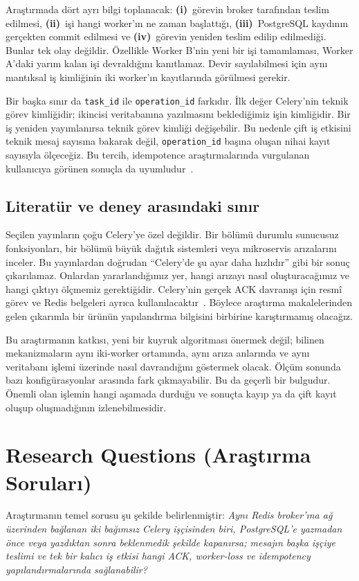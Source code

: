 \documentclass[conference,a4paper]{IEEEtran}
\newcommand{\code}[1]{\texttt{#1}}
\begin{document}
Araştırmada dört ayrı bilgi toplanacak: \textbf{(i)}\ görevin broker tarafından teslim edilmesi, \textbf{(ii)}\ işi hangi worker'ın ne zaman başlattığı, \textbf{(iii)}\ PostgreSQL kaydının gerçekten commit edilmesi ve \textbf{(iv)}\ görevin yeniden teslim edilip edilmediği. Bunlar tek olay değildir. Özellikle Worker B'nin yeni bir işi tamamlaması, Worker A'daki yarım kalan işi devraldığını kanıtlamaz. Devir sayılabilmesi için aynı mantıksal iş kimliğinin iki worker'ın kayıtlarında görülmesi gerekir.

Bir başka sınır da \code{task\_id} ile \code{operation\_id} farkıdır. İlk değer Celery'nin teknik görev kimliğidir; ikincisi veritabanına yazılmasını beklediğimiz işin kimliğidir. Bir iş yeniden yayımlanırsa teknik görev kimliği değişebilir. Bu nedenle çift iş etkisini teknik mesaj sayısına bakarak değil, \code{operation\_id} başına oluşan nihai kayıt sayısıyla ölçeceğiz. Bu tercih, idempotence araştırmalarında vurgulanan kullanıcıya görünen sonuçla da uyumludur~\cite{ding2023,stoica2024}.

\subsection{Literatür ve deney arasındaki sınır}
Seçilen yayınların çoğu Celery'ye özel değildir. Bir bölümü durumlu sunucusuz fonksiyonları, bir bölümü büyük dağıtık sistemleri veya mikroservis arızalarını inceler. Bu yayınlardan doğrudan ``Celery'de şu ayar daha hızlıdır'' gibi bir sonuç çıkarılamaz. Onlardan yararlandığımız yer, hangi arızayı nasıl oluşturacağımız ve hangi çıktıyı ölçmemiz gerektiğidir. Celery'nin gerçek ACK davranışı için resmî görev ve Redis belgeleri ayrıca kullanılacaktır~\cite{celerytasks,celeryredis}. Böylece araştırma makalelerinden gelen çıkarımla bir ürünün yapılandırma bilgisini birbirine karıştırmamış olacağız.

Bu araştırmanın katkısı, yeni bir kuyruk algoritması önermek değil; bilinen mekanizmaların aynı iki-worker ortamında, aynı arıza anlarında ve aynı veritabanı işlemi üzerinde nasıl davrandığını göstermek olacak. Ölçüm sonunda bazı konfigürasyonlar arasında fark çıkmayabilir. Bu da geçerli bir bulgudur. Önemli olan işlemin hangi aşamada durduğu ve sonuçta kayıp ya da çift kayıt oluşup oluşmadığının izlenebilmesidir.

\section{Research Questions (Araştırma Soruları)}
Araştırmanın temel sorusu şu şekilde belirlenmiştir: \textit{Aynı Redis broker'ına ağ üzerinden bağlanan iki bağımsız Celery işçisinden biri, PostgreSQL'e yazmadan önce veya yazdıktan sonra beklenmedik şekilde kapanırsa; mesajın başka işçiye teslimi ve tek bir kalıcı iş etkisi hangi ACK, worker-loss ve idempotency yapılandırmalarında sağlanabilir?}
\end{document}
